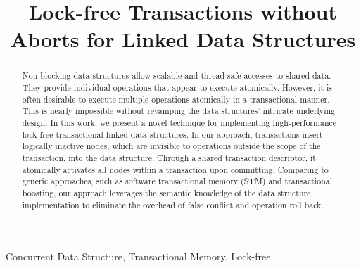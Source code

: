 \documentclass[10pt,conference,compsocconf]{IEEEtran}
\begin{document}
\title{Lock-free Transactions without Aborts for Linked Data Structures}

\author{
}

\maketitle

\begin{abstract}
    Non-blocking data structures allow scalable and thread-safe accesses to shared data. 
    They provide individual operations that appear to execute atomically.
    However, it is often desirable to execute multiple operations atomically in a transactional manner.
    This is nearly impossible without revamping the data structures' intricate underlying design.
    In this work, we present a novel technique for implementing high-performance lock-free transactional linked data structures.
    In our approach, transactions insert logically inactive nodes, which are invisible to operations outside the scope of the transaction, into the data structure.
    Through a shared transaction descriptor, it atomically activates all nodes within a transaction upon committing.
    Comparing to generic approaches, such as software transactional memory (STM) and transactional boosting, our approach leverages the semantic knowledge of the data structure implementation to eliminate the overhead of false conflict and operation roll back.
\end{abstract}

\begin{IEEEkeywords}
    Concurrent Data Structure, Transactional Memory, Lock-free 
\end{IEEEkeywords}
\end{document}
